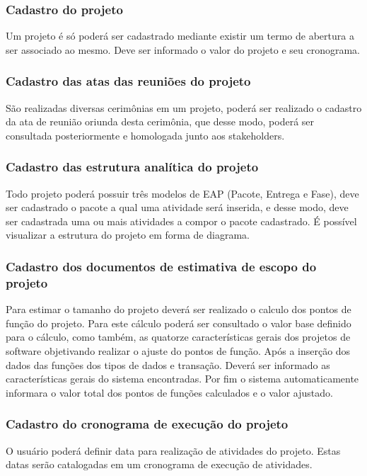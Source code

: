 \documentclass{acm_proc_article-sp}
\begin{document}
\subsubsection{Cadastro do projeto}
Um projeto é só poderá ser cadastrado mediante existir um termo de abertura a ser associado ao mesmo. Deve ser informado o valor do projeto e seu cronograma.

\subsubsection{Cadastro das atas das reuniões do projeto}
São realizadas diversas cerimônias em um projeto, poderá ser realizado o cadastro da ata de reunião oriunda desta cerimônia, que desse modo, poderá ser consultada posteriormente e homologada junto aos stakeholders.

\subsubsection{Cadastro das estrutura analítica do projeto}
Todo projeto poderá possuir três modelos de EAP (Pacote, Entrega e Fase), deve ser cadastrado o pacote a qual uma atividade será inserida, e desse modo, deve ser cadastrada uma ou mais atividades a compor o pacote cadastrado. É possível visualizar a estrutura do projeto em forma de diagrama. 

\subsubsection{Cadastro dos documentos de estimativa de escopo do projeto}
Para estimar o tamanho do projeto deverá ser realizado o calculo dos pontos de função do projeto. Para este cálculo poderá ser consultado o valor base definido para o cálculo, como também, as quatorze características gerais dos projetos de software objetivando realizar o ajuste do pontos de função. Após a inserção dos dados das funções dos tipos de dados e transação. Deverá ser informado as características gerais do sistema encontradas. Por fim o sistema automaticamente informara o valor total dos pontos de funções calculados e o valor ajustado.

\subsubsection{Cadastro do cronograma de execução do projeto}
O usuário poderá definir data para realização de atividades do projeto. Estas datas serão catalogadas em um cronograma de execução de atividades.
\end{document}
